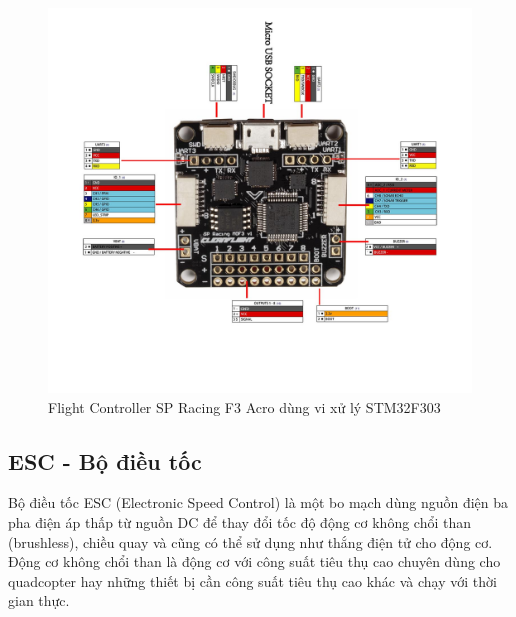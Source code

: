     \begin{figure}[h!]
    	\begin{center}
    		\includegraphics[scale=1.1]{images/sp_racing_f3.jpg}
    		\caption{Flight Controller SP Racing F3 Acro dùng vi xử lý STM32F303}
    	\end{center}
    \end{figure}
    
    \subsection{ESC - Bộ điều tốc}
    Bộ điều tốc ESC (Electronic Speed Control) là một bo mạch dùng nguồn điện ba pha điện áp thấp từ nguồn DC để thay đổi tốc độ động cơ không chổi than (brushless), chiều quay và cũng có thể sử dụng như thắng điện tử cho động cơ. Động cơ không chổi than là động cơ với công suất tiêu thụ cao chuyên dùng cho quadcopter hay những thiết bị cần công suất tiêu thụ cao khác và chạy với thời gian thực. 
    
